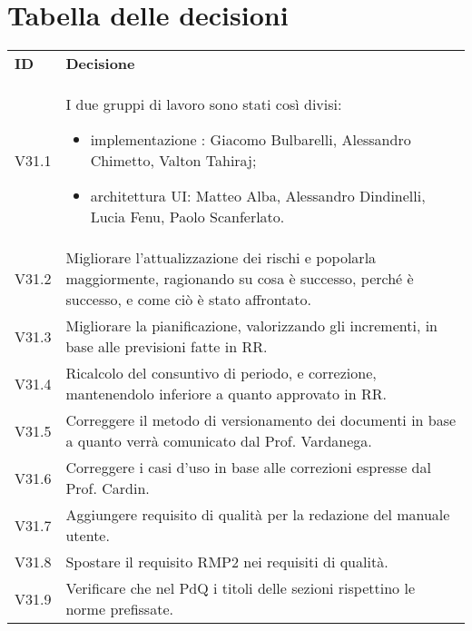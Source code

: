 \documentclass[]{article}
\begin{document}
	\newpage

	\section{Tabella delle decisioni}

	\begin{table} [h!]
		\begin{center}
			\begin{tabular} { m{2cm} m{14cm} }
				\rowcolor{lightgray}
				\textbf{ID} & \textbf{Decisione}\\
				V31.1 & I due gruppi di lavoro sono stati così divisi:
				 \begin{itemize}
					\item implementazione \glock{WebSocket}: Giacomo Bulbarelli, Alessandro Chimetto, Valton Tahiraj;
					\item architettura UI: Matteo Alba, Alessandro Dindinelli, Lucia Fenu, Paolo Scanferlato.
				\end{itemize}\\
				V31.2 & Migliorare l'attualizzazione dei rischi e popolarla maggiormente, ragionando su cosa è successo, perché è successo, e come ciò è stato affrontato. \\
				V31.3 & Migliorare la pianificazione, valorizzando gli incrementi, in base alle previsioni fatte in RR. \\
				V31.4 & Ricalcolo del consuntivo di periodo, e correzione, mantenendolo inferiore a quanto approvato in RR. \\
				V31.5 & Correggere il metodo di versionamento dei documenti in base a quanto verrà comunicato dal Prof. Vardanega. \\
				V31.6 & Correggere i casi d'uso in base alle correzioni espresse dal Prof. Cardin. \\
				V31.7 & Aggiungere requisito di qualità per la redazione del manuale utente. \\
				V31.8 & Spostare il requisito RMP2 nei requisiti di qualità. \\
				V31.9 & Verificare che nel PdQ i titoli delle sezioni rispettino le norme prefissate. \\
			\end{tabular}
		\end{center}
	\end{table}
\end{document}
